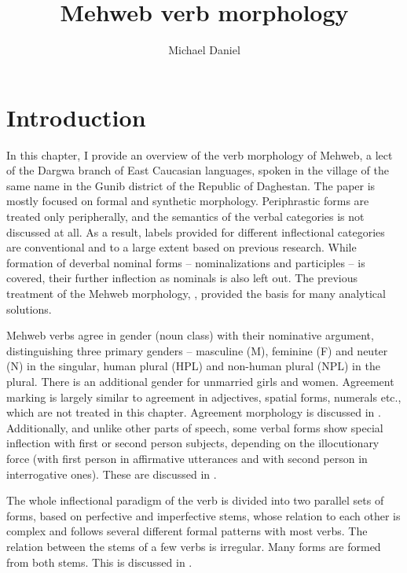 \documentclass[output=paper]{langsci/langscibook}
\title{Mehweb verb morphology}
\author{Michael Daniel\affiliation{National Research University Higher School of Economics}}
\begin{document}
\maketitle


\let\exfont\rm
\let\eachwordone\rm

\section{Introduction}\label{introduction-5}

In this chapter, I provide an overview of the verb morphology of Mehweb,
a lect of the Dargwa branch of East Caucasian languages, spoken in the
village of the same name in the Gunib district of the Republic of
Daghestan. The paper is mostly focused on formal and synthetic
morphology. Periphrastic forms are treated only peripherally, and the
semantics of the verbal categories is not discussed at all. As a result,
labels provided for different inflectional categories are conventional
and to a large extent based on previous research. While formation of
deverbal nominal forms – nominalizations and participles – is covered,
their further inflection as nominals is also left out. The previous
treatment of the Mehweb morphology, \citet{magometov1982}, provided the basis
for many analytical solutions.
{\par}


Mehweb verbs agree in gender (noun class) with their nominative
argument, distinguishing three primary genders – masculine (M),
feminine (F) and neuter (N) in the singular, human plural (HPL) and
non-human plural (NPL) in the plural. There is an additional gender for
unmarried girls and women. Agreement marking is largely similar to
agreement in adjectives, spatial forms, numerals etc., which are not
treated in this chapter. Agreement morphology
is discussed in .
Additionally, and unlike other parts of speech, some verbal forms show
special inflection with first or second person subjects, depending on
the illocutionary force (with first person in affirmative utterances and
with second person in interrogative ones). These are
discussed in .


The whole inflectional paradigm of the verb is divided into two parallel
sets of forms, based on perfective and imperfective stems, whose
relation to each other is complex and follows several different formal
patterns with most verbs. The relation between the stems of a few verbs is irregular. Many
forms are formed from both stems. This is discussed in .
\end{document}
